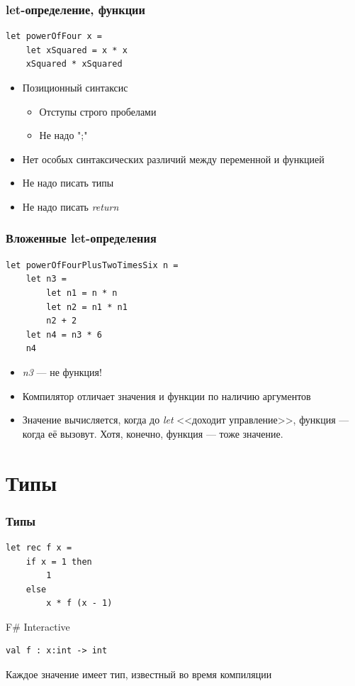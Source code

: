 \documentclass[xetex,mathserif,serif]{beamer}
\begin{document}
    \begin{frame}[fragile]
        \frametitle{let-определение, функции}
        \begin{verbatim}
let powerOfFour x = 
    let xSquared = x * x
    xSquared * xSquared
        \end{verbatim}
        \begin{itemize}
            \item Позиционный синтаксис
            \begin{itemize}
                \item Отступы строго пробелами
                \item Не надо ";"
            \end{itemize}
            \item Нет особых синтаксических различий между переменной и функцией
            \item Не надо писать типы
            \item Не надо писать \textit{return}
        \end{itemize}
    \end{frame}

    \begin{frame}[fragile]
        \frametitle{Вложенные let-определения}
        \begin{verbatim}
let powerOfFourPlusTwoTimesSix n =
    let n3 =
        let n1 = n * n
        let n2 = n1 * n1
        n2 + 2
    let n4 = n3 * 6
    n4
        \end{verbatim}
        \begin{itemize}
            \item \textit{n3} --- не функция!
            \item Компилятор отличает значения и функции по наличию аргументов
            \item Значение вычисляется, когда до \textit{let} <<доходит управление>>, 
                    функция --- когда её вызовут. Хотя, конечно, функция --- тоже значение.
        \end{itemize}
    \end{frame}

    \section{Типы}

    \begin{frame}[fragile]
        \frametitle{Типы}
        \begin{verbatim}
let rec f x =
    if x = 1 then 
        1 
    else 
        x * f (x - 1)
        \end{verbatim}

        \begin{alertblock}{F\# Interactive}
            \begin{verbatim}
val f : x:int -> int
            \end{verbatim}
        \end{alertblock}
        Каждое значение имеет тип, известный во время компиляции
    \end{frame}
\end{document}
